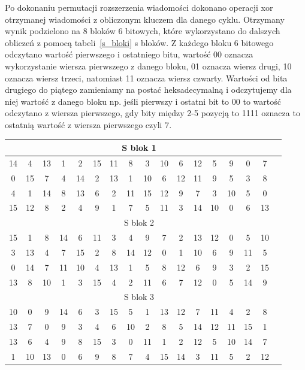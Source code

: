 \documentclass[12p]{article}
\begin{document}
Po dokonaniu permutacji rozszerzenia wiadomości dokonano operacji xor otrzymanej wiadomości z obliczonym kluczem dla danego cyklu. Otrzymany wynik podzielono na 8 bloków 6 bitowych, które wykorzystano do dalszych obliczeń z pomocą tabeli~\ref{s_bloki} s bloków. Z każdego bloku 6 bitowego odczytano wartość pierwszego i ostatniego bitu, wartość 00 oznacza wykorzystanie wiersza pierwszego z danego bloku, 01 oznacza wiersz drugi, 10 oznacza wiersz trzeci, natomiast 11 oznacza wiersz czwarty. Wartości od bita drugiego do piątego zamieniamy na postać heksadecymalną i odczytujemy dla niej wartość z danego bloku np. jeśli pierwszy i ostatni bit to 00 to wartość odczytano z wiersza pierwszego, gdy bity między 2-5 pozycją to 1111 oznacza to ostatnią wartość z wiersza pierwszego czyli 7.

\begin{table}[H]
\centering
\begin{tabular}{|c|c|c|c|c|c|c|c|c|c|c|c|c|c|c|c|c|}
\hline
\multicolumn{16}{|c|}{S blok 1}\\ 
\hline
14&4&13&1&2&15&11&8&3&10&6&12&5&9&0&7 \\ \hline
0 &	15& 	7 &	4 &	14 &	2& 	13& 	1 &	10 &	6 &	12 &	11 &	9 &	5 &	3 &	8 \\ \hline
4 &	1 &	14 &	8 	&13 	&6 &	2& 	11& 	15& 	12 &	9 	&7& 	3& 	10& 	5& 	0 \\ \hline
15 &	12& 	8 &	2 &	4 &	9 &	1 &	7 &	5 &	11 &	3 &	14 &	10 &	0 &	6 &	13 \\ \hline
\multicolumn{16}{|c|}{S blok 2} \\ \hline
15 &	1 &	8 &	14 &	6 &	11 &	3 &	4 &	9 &	7 &	2 &	13 &	12 &	0 &	5 &	10 \\ \hline
3 &	13& 	4 &	7 &	15 &	2 &	8 &	14 &	12 &	0 &	1 &	10 &	6 &	9 &	11 &	5 \\ \hline
0 &	14 &	7 &	11 &	10 &	4 &	13 &	1 &	5 &	8 &	12 &	6 &	9 &	3 &	2 &	15 \\ \hline
13 &	8 &	10 &	1 &	3 &	15 &	4 &	2 &	11 &	6 &	7 &	12 &	0 &	5 &	14 &	9 \\ \hline
\multicolumn{16}{|c|}{S blok 3}\\ \hline
10 &	0 &	9 &	14 &	6 &	3 &	15 &	5 &	1 &	13 &	12 &	7 &	11 &	4 &	2 &	8\\ \hline
13 &	7 &	0 &	9 &	3 &	4 &	6 &	10 &	2 &	8 &	5 &	14 &	12 &	11 &	15 &	1\\ \hline
13 &	6 &	4 &	9 &	8 &	15 &	3 &	0 &	11 &	1 &	2 &	12 &	5 &	10 &	14 &	7\\ \hline
1 &	10 &	13 &	0 &	6 &	9 &	8 &	7 &	4 &	15 &	14 &	3 &	11 &	5 &	2 &	12 \\ \hline

\end{tabular}
\end{table}
\end{document}
